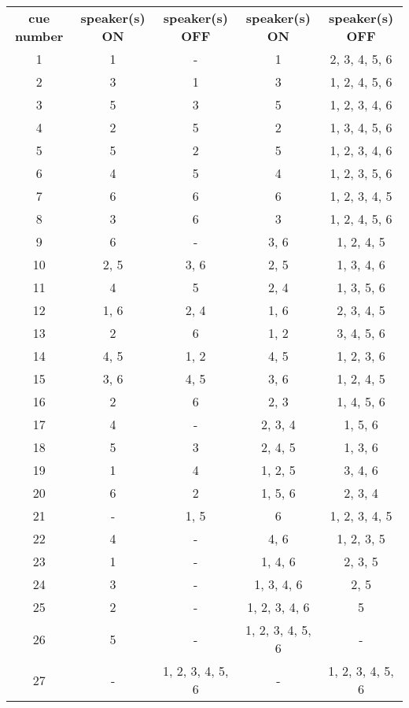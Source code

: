 \begin{table*}[h]
\begin{center}
\begin{tabular}{c c c c c}
\textbf{cue number} 	& \textbf{speaker(s) ON}	& \textbf{speaker(s) OFF} 		& \textbf{speaker(s) ON} 		& \textbf{speaker(s) OFF} 		\\
1			&	1			&	-					&	1					&	2, 3, 4, 5, 6 		\\
2			&	3			&	1					&	3					&	1, 2, 4, 5, 6 		\\
3			&	5			&	3					&	5					&	1, 2, 3, 4, 6 		\\
4			&	2			&	5					&	2					&	1, 3, 4, 5, 6 		\\
5			&	5			&	2					&	5					&	1, 2, 3, 4, 6 		\\
6			& 	4			&	5					&	4					&	1, 2, 3, 5, 6 		\\
7			&	6			&	6					&	6					&	1, 2, 3, 4, 5		\\
8			&	3			&	6					&	3					&	1, 2, 4, 5, 6 		\\
9			&	6			&	-					&	3, 6				&	1, 2, 4, 5 			\\
10			&	2, 5		&	3, 6				&	2, 5				&	1, 3, 4, 6 			\\
11			&	4		 	&	5					&	2, 4				&	1, 3, 5, 6 			\\
12			&	1, 6		&	2, 4				&	1, 6				&	2, 3, 4, 5 			\\
13			&	2			&	6					&	1, 2				&	3, 4, 5, 6 			\\
14			&	4, 5		&	1, 2				&	4, 5				&	1, 2, 3, 6 			\\
15			&	3, 6		&	4, 5				&	3, 6				&	1, 2, 4, 5 			\\
16			&	2			&	6					&	2, 3				&	1, 4, 5, 6 			\\
17			&	4			&	-					&	2, 3, 4 			&	1, 5, 6 			\\
18			&	5			&	3					&	2, 4, 5 			&	1, 3, 6 			\\
19			&	1			&	4					&	1, 2, 5 			&	3, 4, 6 			\\
20			&	6			&	2					&	1, 5, 6 			&	2, 3, 4 			\\
21			&	-			&	1, 5				&	6 					&	1, 2, 3, 4, 5 		\\
22			&	4			&	-					&	4, 6 				&	1, 2, 3, 5			\\
23			&	1			&	-					&	1, 4, 6 			&	2, 3, 5 			\\
24			&	3			&	-					&	1, 3, 4, 6 			&	2, 5 				\\
25			&	2			&	-					&	1, 2, 3, 4, 6 		&	5 					\\
26			&	5			&	-					&	1, 2, 3, 4, 5, 6	&	- 					\\
27			&	-			&	1, 2, 3, 4, 5, 6	&	-					&	1, 2, 3, 4, 5, 6	\\

\end{tabular}
\end{center}
\label{tab:diffsiginit}

\end{table*}

